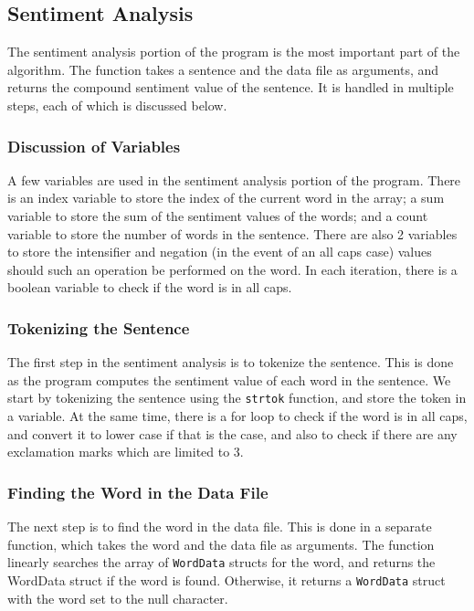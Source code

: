 \documentclass[12pt]{article}
\begin{document}
\subsection{Sentiment Analysis}

The sentiment analysis portion of the program is the most important part of the algorithm.
The function takes a sentence and the data file as arguments, and returns the compound sentiment value of the sentence.
It is handled in multiple steps, each of which is discussed below.

\subsubsection{Discussion of Variables}

A few variables are used in the sentiment analysis portion of the program.
There is an index variable to store the index of the current word in the array; a sum variable to store the sum of the sentiment values of the words; and a count variable to store the number of words in the sentence.
There are also 2 variables to store the intensifier and negation (in the event of an all caps case) values should such an operation be performed on the word.
In each iteration, there is a boolean variable to check if the word is in all caps.

\subsubsection{Tokenizing the Sentence}

The first step in the sentiment analysis is to tokenize the sentence.
This is done as the program computes the sentiment value of each word in the sentence.
We start by tokenizing the sentence using the \texttt{strtok} function, and store the token in a variable.
At the same time, there is a for loop to check if the word is in all caps, and convert it to lower case if that is the case, and also to check if there are any exclamation marks which are limited to 3.

\subsubsection{Finding the Word in the Data File}

The next step is to find the word in the data file.
This is done in a separate function, which takes the word and the data file as arguments.
The function linearly searches the array of \texttt{WordData} structs for the word, and returns the WordData struct if the word is found.
Otherwise, it returns a \texttt{WordData} struct with the word set to the null character.
\end{document}
